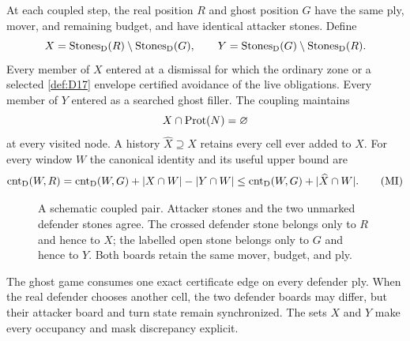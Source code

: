 \begin{definition}
\label{def:D12}
At each coupled step, the real position $R$ and ghost position $G$ have the
same ply, mover, and remaining budget, and have identical attacker stones.
Define
\[
 X=\operatorname{Stones}_{\mathrm{D}}(R)\setminus\operatorname{Stones}_{\mathrm{D}}(G),
 \qquad
 Y=\operatorname{Stones}_{\mathrm{D}}(G)\setminus\operatorname{Stones}_{\mathrm{D}}(R).
\]
Every member of $X$ entered at a dismissal for which the ordinary zone or a
selected \cref{def:D17} envelope certified avoidance of the live obligations.
Every member of $Y$ entered as a searched ghost filler.  The coupling
maintains
\[
  X\cap\operatorname{Prot}(N)=\varnothing
\]
at every visited node.  A history $\widehat X\supseteq X$ retains every cell
ever added to $X$.  For every window $W$ the canonical identity and its useful
upper bound are
\begin{equation}
\operatorname{cnt}_{\mathrm{D}}(W,R)=\operatorname{cnt}_{\mathrm{D}}(W,G)+|X\cap W|-|Y\cap W|
 \le\operatorname{cnt}_{\mathrm{D}}(W,G)+|\widehat X\cap W|.
\tag{MI}\label{eq:MI}
\end{equation}
\end{definition}

\begin{figure}[tbp]
  \centering
  \caption{A schematic coupled pair.  Attacker stones and the two unmarked
  defender stones agree.  The crossed defender stone belongs only to $R$ and
  hence to $X$; the labelled open stone belongs only to $G$ and hence to $Y$.
  Both boards retain the same mover, budget, and ply.}
  \label{fig:ghost-coupling}
\end{figure}

\begin{plainterms}
The ghost game consumes one exact certificate edge on every defender ply.
When the real defender chooses another cell, the two defender boards may
differ, but their attacker board and turn state remain synchronized.  The
sets $X$ and $Y$ make every occupancy and mask discrepancy explicit.
\end{plainterms}

